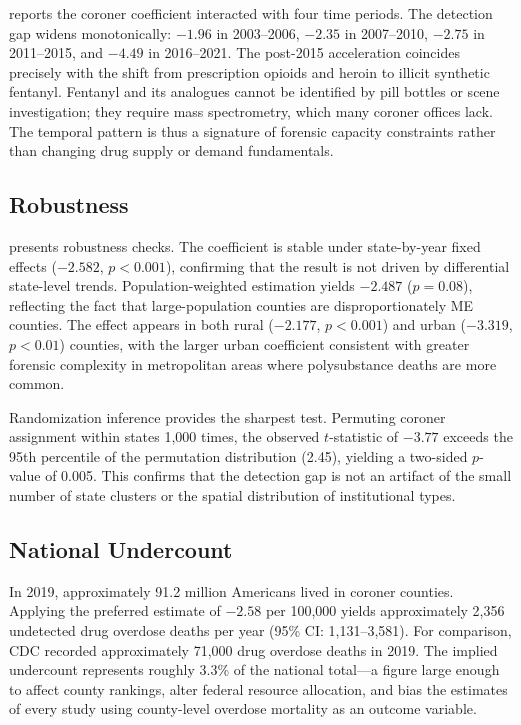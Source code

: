 \documentclass[12pt]{article}
\begin{document}
 reports the coroner coefficient interacted with four time periods. The detection gap widens monotonically: $-1.96$ in 2003--2006, $-2.35$ in 2007--2010, $-2.75$ in 2011--2015, and $-4.49$ in 2016--2021. The post-2015 acceleration coincides precisely with the shift from prescription opioids and heroin to illicit synthetic fentanyl. Fentanyl and its analogues cannot be identified by pill bottles or scene investigation; they require mass spectrometry, which many coroner offices lack. The temporal pattern is thus a signature of forensic capacity constraints rather than changing drug supply or demand fundamentals.



\subsection{Robustness}

 presents robustness checks. The coefficient is stable under state-by-year fixed effects ($-2.582$, $p < 0.001$), confirming that the result is not driven by differential state-level trends. Population-weighted estimation yields $-2.487$ ($p = 0.08$), reflecting the fact that large-population counties are disproportionately ME counties. The effect appears in both rural ($-2.177$, $p < 0.001$) and urban ($-3.319$, $p < 0.01$) counties, with the larger urban coefficient consistent with greater forensic complexity in metropolitan areas where polysubstance deaths are more common.

Randomization inference provides the sharpest test. Permuting coroner assignment within states 1,000 times, the observed $t$-statistic of $-3.77$ exceeds the 95th percentile of the permutation distribution (2.45), yielding a two-sided $p$-value of 0.005. This confirms that the detection gap is not an artifact of the small number of state clusters or the spatial distribution of institutional types.



\subsection{National Undercount}

In 2019, approximately 91.2 million Americans lived in coroner counties. Applying the preferred estimate of $-2.58$ per 100,000 yields approximately 2,356 undetected drug overdose deaths per year (95\% CI: 1,131--3,581). For comparison, CDC recorded approximately 71,000 drug overdose deaths in 2019. The implied undercount represents roughly 3.3\% of the national total---a figure large enough to affect county rankings, alter federal resource allocation, and bias the estimates of every study using county-level overdose mortality as an outcome variable.
\end{document}
